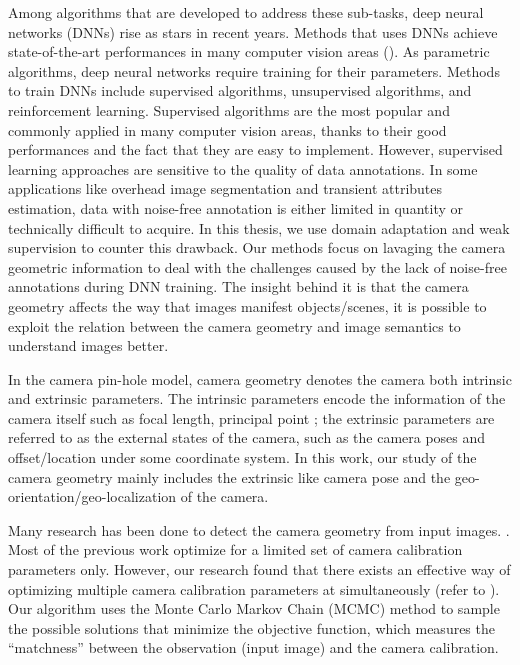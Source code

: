 Among algorithms that are developed to address these sub-tasks, deep
neural networks (DNNs) rise as stars in recent years. Methods that
uses DNNs achieve state-of-the-art performances in many computer
vision areas (). As parametric algorithms, deep neural
networks require training for their parameters. Methods to train DNNs
include supervised algorithms, unsupervised algorithms, and
reinforcement learning. Supervised algorithms are the most popular and
commonly applied in many computer vision areas, thanks to their good
performances and the fact that they are easy to implement. However,
supervised learning approaches are sensitive to the quality of data
annotations. In some applications like overhead image segmentation and
transient attributes estimation, data with noise-free annotation is
either limited in quantity or technically difficult to acquire.
In this thesis, we use domain adaptation and weak supervision to
counter this drawback. Our methods focus on lavaging the camera
geometric information to deal with the challenges caused by the lack
of noise-free annotations during DNN training.
The insight behind it is that the camera geometry affects the way that
images manifest objects/scenes, it is possible to exploit the relation
between the camera geometry and image semantics to understand images
better.

\sepline

In the camera pin-hole model, camera geometry denotes the camera
both intrinsic and extrinsic parameters. The intrinsic parameters
encode the information of the camera itself such as focal length,
principal point \etc; the extrinsic parameters are referred to as the
external states of the camera, such as the camera poses and
offset/location under some coordinate system. In this work, our study
of the camera geometry mainly includes the extrinsic like camera pose
and the geo-orientation/geo-localization of the camera.

Many research has been done to detect the camera
geometry from input images. . Most of the
previous work optimize for a limited set of camera calibration
parameters only. However, our research found that there exists an
effective way of optimizing multiple camera calibration parameters at
simultaneously (refer to ). Our algorithm uses the Monte
Carlo Markov Chain (MCMC) method to sample the possible solutions that
minimize the objective function, which measures the ``matchness''
between the observation (input image) and the camera calibration.

